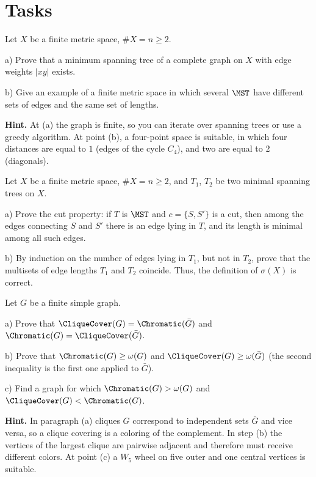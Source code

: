 \documentclass[a4paper,12pt]{report}
\begin{document}
\section*{Tasks}

\begin{task}
Let $X$ be a finite metric space, $\#X=n\ge2$.

\textup{a)} Prove that a minimum spanning tree of a complete graph on $X$ with edge weights $|xy|$ exists.

\textup{b)} Give an example of a finite metric space in which several $\MST$ have different sets of edges and the same set of lengths.

\textbf{Hint.} At \textup{(a)} the graph is finite, so you can iterate over spanning trees or use a greedy algorithm. At point \textup{(b)}, a four-point space is suitable, in which four distances are equal to $1$ (edges of the cycle $C_4$), and two are equal to $2$ (diagonals).
\end{task}

\begin{task}
Let $X$ be a finite metric space, $\#X=n\ge2$, and $T_1$, $T_2$ be two minimal spanning trees on $X$.

\textup{a)} Prove the cut property\textup{:} if $T$ is $\MST$ and $c=\{S,S'\}$ is a cut, then among the edges connecting $S$ and $S'$ there is an edge lying in $T$, and its length is minimal among all such edges.

\textup{b)} By induction on the number of edges lying in $T_1$, but not in $T_2$, prove that the multisets of edge lengths $T_1$ and $T_2$ coincide. Thus, the definition of $\sigma(X)$ is correct.
\end{task}

\begin{task}
Let $G$ be a finite simple graph.

\textup{a)} Prove that $\CliqueCover(G)=\Chromatic(\bar G)$ and $\Chromatic(G)=\CliqueCover(\bar G)$.

\textup{b)} Prove that $\Chromatic(G)\ge\omega(G)$ and $\CliqueCover(G)\ge\omega(\bar G)$ (the second inequality is the first one applied to $\bar G$).

\textup{c)} Find a graph for which $\Chromatic(G)>\omega(G)$ and $\CliqueCover(G)<\Chromatic(G)$.

\textbf{Hint.} In paragraph \textup{(a)} cliques $G$ correspond to independent sets $\bar G$ and vice versa, so a clique covering is a coloring of the complement. In step \textup{(b)} the vertices of the largest clique are pairwise adjacent and therefore must receive different colors. At point \textup{(c)} a $W_5$ wheel on five outer and one central vertices is suitable.
\end{task}
\end{document}
